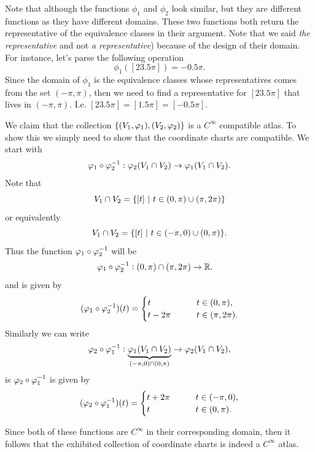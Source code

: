 \begin{solution}
	Note that although the functions $ \phi_1 $ and $ \phi_2 $ look similar, but they are different functions as they have different domains. These two functions both return the representative of the equivalence classes in their argument. Note that we said \emph{the representative} and not \emph{a representative}) because of the design of their domain. For instance, let's parse the following operation 
	\[ \phi_1 ([23.5\pi]) =  -0.5\pi. \]
	Since the domain of $ \phi_1 $ is the equivalence classes whose representatives comes from the set $ (-\pi,\pi) $, then we need to find a representative for $ [23.5\pi] $ that lives in $ (-\pi,\pi) $. I.e. $ [23.5\pi] = [1.5\pi] = [-0.5\pi] $. 
	
	\noindent We claim that the collection $ \{(V_1,\varphi_1), (V_2,\varphi_2)\} $ is a $ C^\infty $ compatible atlas. To show this we simply need to show that the coordinate charts are compatible. We start with
	\[ \varphi_1\circ\varphi_2^{-1}: \varphi_2(V_1\cap V_2) \to \varphi_1(V_1\cap V_2). \]
	Note that 
	\[ V_1\cap V_2 = \set{[t]\ |\ t\in(0,\pi)\cup(\pi,2\pi)} \]
	or equivalently
	\[ V_1\cap V_2  = \{[t]\ |\ t\in(-\pi,0) \cup (0,\pi) \}. \]
	Thus the function $ \varphi_1\circ\varphi_2^{-1} $ will be
	\begin{align*}
		\varphi_1\circ\varphi_2^{-1} &: (0,\pi)\cap(\pi,2\pi) \to \mathbb{R}.
	\end{align*}
	and is given by
	\[ (\varphi_1\circ\varphi_2^{-1})(t) = \begin{cases}
		t \qquad &t\in(0,\pi),\\
		t-2\pi \qquad &t\in(\pi,2\pi).
	\end{cases} \]
	Similarly we can write
	\[ \varphi_2\circ\varphi_1^{-1}: \underbrace{\varphi_1(V_1\cap V_2)}_{(-\pi,0)\cap(0,\pi)} \to \varphi_2(V_1\cap V_2), \]
	is $ \varphi_2\circ\varphi_1^{-1} $ is given by
	\[ (\varphi_2\circ\varphi_1^{-1})(t) = \begin{cases}
		t + 2\pi \qquad & t\in(-\pi,0),\\
		t \qquad & t\in (0,\pi).
	\end{cases} \]
	
	Since both of these functions are $ C^\infty $ in their corresponding domain, then it follows that the exhibited collection of coordinate charts is indeed a $ C^\infty $ atlas.

\end{solution}

